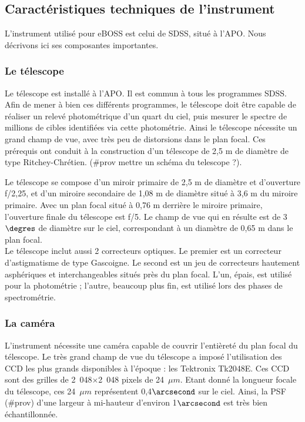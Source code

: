 \documentclass[11pt, twoside, a4paper, openright]{report}
\begin{document}
\subsection{Caractéristiques techniques de l'instrument}
L'instrument \cite{Gunn2006} utilisé pour eBOSS est celui de SDSS, situé à l'APO. Nous décrivons ici ses composantes importantes.

\subsubsection{Le télescope}
Le télescope est installé à l'APO. Il est commun à tous les programmes SDSS. Afin de mener à bien ces différents programmes, le télescope doit être capable de réaliser un relevé photométrique d'un quart du ciel, puis mesurer le spectre de millions de cibles identifiées via cette photométrie. Ainsi le télescope nécessite un grand champ de vue, avec très peu de distorsions dans le plan focal. Ces prérequis ont conduit à la construction d'un télescope de 2,5 m de diamètre de type Ritchey-Chrétien. (\#prov mettre un schéma du telescope ?).

Le télescope se compose d'un miroir primaire de 2,5 m de diamètre et d'ouverture f/2,25, et d'un miroire secondaire de 1,08 m de diamètre situé à 3,6 m du miroire primaire. Avec un plan focal situé à 0,76 m derrière le miroire primaire, l'ouverture finale du télescope est f/5. Le champ de vue qui en résulte est de 3$\degres$ de diamètre sur le ciel, correspondant à un diamètre de 0,65 m dans le plan focal. \\
Le télescope inclut aussi 2 correcteurs optiques. Le premier est un correcteur d'astigmatisme de type Gascoigne. Le second est un jeu de correcteurs hautement asphériques et interchangeables situés près du plan focal. L'un, épais, est utilisé pour la photométrie ; l'autre, beaucoup plus fin, est utilisé lors des phases de spectrométrie.


\subsubsection{La caméra}
L'instrument nécessite une caméra \cite{Gunn1998} capable de couvrir l'entièreté du plan focal du télescope. Le très grand champ de vue du télescope a imposé l'utilisation des CCD les plus grands disponibles à l'époque : les Tektronix Tk2048E. Ces CCD sont des grilles de 2~048$\times$2~048 pixels de 24~$\mu m$. Etant donné la longueur focale du télescope, ces 24~$\mu m$ représentent 0,4$\arcsecond$ sur le ciel. Ainsi, la PSF (\#prov) d'une largeur à mi-hauteur d'environ 1$\arcsecond$ est très bien échantillonnée.
\end{document}
